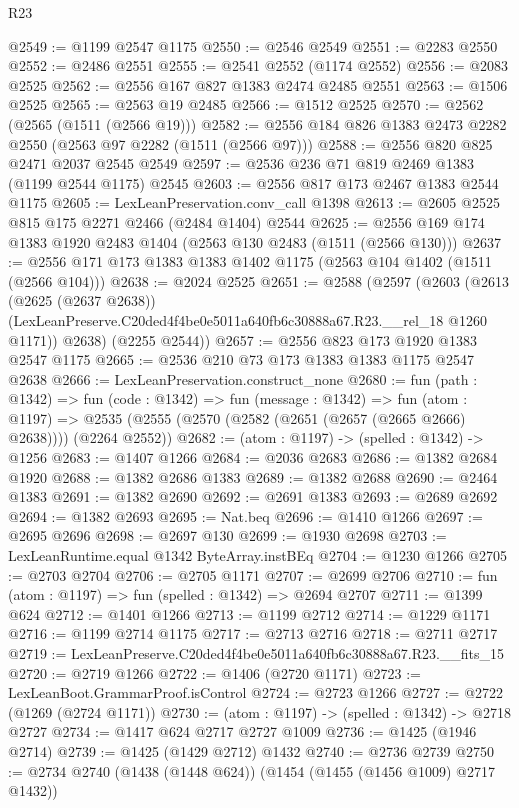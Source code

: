 \begin{lexlean}{R23}
\begin{coremodule}
@2549 := @1199 @2547 @1175
@2550 := @2546 @2549
@2551 := @2283 @2550
@2552 := @2486 @2551
@2555 := @2541 @2552 (@1174 @2552)
@2556 := @2083 @2525
@2562 := @2556 @167 @827 @1383 @2474 @2485 @2551
@2563 := @1506 @2525
@2565 := @2563 @19 @2485
@2566 := @1512 @2525
@2570 := @2562 (@2565 (@1511 (@2566 @19)))
@2582 := @2556 @184 @826 @1383 @2473 @2282 @2550 (@2563 @97 @2282 (@1511 (@2566 @97)))
@2588 := @2556 @820 @825 @2471 @2037 @2545 @2549
@2597 := @2536 @236 @71 @819 @2469 @1383 (@1199 @2544 @1175) @2545
@2603 := @2556 @817 @173 @2467 @1383 @2544 @1175
@2605 := LexLeanPreservation.conv_call @1398
@2613 := @2605 @2525 @815 @175 @2271 @2466 (@2484 @1404) @2544
@2625 := @2556 @169 @174 @1383 @1920 @2483 @1404 (@2563 @130 @2483 (@1511 (@2566 @130)))
@2637 := @2556 @171 @173 @1383 @1383 @1402 @1175 (@2563 @104 @1402 (@1511 (@2566 @104)))
@2638 := @2024 @2525
@2651 := @2588
    (@2597
      (@2603
        (@2613
          (@2625 (@2637 @2638))
          (LexLeanPreserve.C20ded4f4be0e5011a640fb6c30888a67.R23.__rel_18 @1260 @1171))
        @2638)
      (@2255 @2544))
@2657 := @2556 @823 @173 @1920 @1383 @2547 @1175
@2665 := @2536 @210 @73 @173 @1383 @1383 @1175 @2547 @2638
@2666 := LexLeanPreservation.construct_none
@2680 := fun (path : @1342) =>
  fun (code : @1342) =>
  fun (message : @1342) =>
  fun (atom : @1197) =>
  @2535 (@2555 (@2570 (@2582 (@2651 (@2657 (@2665 @2666) @2638)))) (@2264 @2552))
@2682 := (atom : @1197) -> (spelled : @1342) -> @1256
@2683 := @1407 @1266
@2684 := @2036 @2683
@2686 := @1382 @2684 @1920
@2688 := @1382 @2686 @1383
@2689 := @1382 @2688
@2690 := @2464 @1383
@2691 := @1382 @2690
@2692 := @2691 @1383
@2693 := @2689 @2692
@2694 := @1382 @2693
@2695 := Nat.beq
@2696 := @1410 @1266
@2697 := @2695 @2696
@2698 := @2697 @130
@2699 := @1930 @2698
@2703 := LexLeanRuntime.equal @1342 ByteArray.instBEq
@2704 := @1230 @1266
@2705 := @2703 @2704
@2706 := @2705 @1171
@2707 := @2699 @2706
@2710 := fun (atom : @1197) => fun (spelled : @1342) => @2694 @2707
@2711 := @1399 @624
@2712 := @1401 @1266
@2713 := @1199 @2712
@2714 := @1229 @1171
@2716 := @1199 @2714 @1175
@2717 := @2713 @2716
@2718 := @2711 @2717
@2719 := LexLeanPreserve.C20ded4f4be0e5011a640fb6c30888a67.R23.__fits_15
@2720 := @2719 @1266
@2722 := @1406 (@2720 @1171)
@2723 := LexLeanBoot.GrammarProof.isControl
@2724 := @2723 @1266
@2727 := @2722 (@1269 (@2724 @1171))
@2730 := (atom : @1197) -> (spelled : @1342) -> @2718 @2727
@2734 := @1417 @624 @2717 @2727 @1009
@2736 := @1425 (@1946 @2714)
@2739 := @1425 (@1429 @2712) @1432
@2740 := @2736 @2739
@2750 := @2734 @2740 (@1438 (@1448 @624)) (@1454 (@1455 (@1456 @1009) @2717 @1432))

\end{coremodule}
\end{lexlean}
